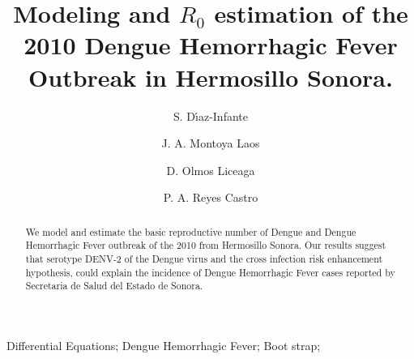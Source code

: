 \title{
		Modeling and $R_0$ estimation  of the 2010 Dengue Hemorrhagic Fever 
        Outbreak in Hermosillo Sonora.
}%
\author[conacyt-unison]{S. D\'{\i}az-Infante }
%
\author[unison]{J. A. Montoya Laos}
%
\author[unison]{D. Olmos Liceaga}
%
\author[colson]{P. A. Reyes Castro}

\address[conacyt-unison]{
	CONACYT-Universidad de Sonora,
	Departamento de Matem\'aticas, Universidad de Sonora\\
	Blvd. Rosales y Luis Encinas S/N, Col. Centro, Hermosillo, Sonora, C.P. 83000,
	M\'exico\\
}
%
\address[unison]{
	Departamento de Matem\'aticas, Universidad de Sonora\\
	Blvd. Rosales y Luis Encinas S/N, Col. Centro, Hermosillo, Sonora, C.P. 83000,
	M\'exico\\
}
%
\address[colson]{
	Centro de Estudios en Salud y Sociedad,
	El Colegio de Sonora, Avenida Obregón No. 54, Colonia Centro, C.P. 83000,
	Hermosillo, Sonora. México
}
%
\begin{abstract}
	We model and estimate the basic reproductive number of Dengue  and 
	Dengue Hemorrhagic Fever outbreak of the 2010 from Hermosillo Sonora.
	Our results suggest that serotype DENV-2 of the Dengue virus and the cross 
    infection risk enhancement hypothesis, could explain the incidence of
    Dengue Hemorrhagic Fever cases reported by Secretaria de Salud del Estado de 
    Sonora.
\end{abstract}
\begin{keyword}
	Differential Equations;
	Dengue Hemorrhagic Fever;
	Boot strap;
\end{keyword}
